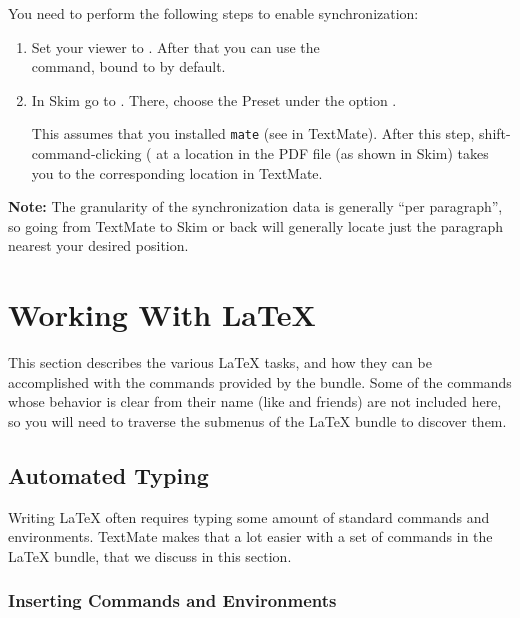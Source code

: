 \documentclass[11pt, x11names]{article}
\begin{document}
You need to perform the following steps to enable synchronization:

\begin{enumerate}

  \item Set your viewer to . After that you can use the\\ command, bound to  by default.

  \item In Skim go to . There, choose the Preset  under the option .

  This assumes that you installed \texttt{mate} (see  in TextMate). After this step, shift-command-clicking (\keys{\shift + \cmd} at a location in the PDF file (as shown in Skim) takes you to the corresponding location in TextMate.

\end{enumerate}

\textbf{Note:} The granularity of the synchronization data is generally “per paragraph”, so going from TextMate to Skim or back will generally locate just the paragraph nearest your desired position.

\section{Working With LaTeX}

This section describes the various LaTeX tasks, and how they can be accomplished with the commands provided by the bundle. Some of the commands whose behavior is clear from their name (like  and friends) are not included here, so you will need to traverse the submenus of the LaTeX bundle to discover them.

\subsection{Automated Typing}

Writing LaTeX often requires typing some amount of standard commands and environments. TextMate makes that a lot easier with a set of commands in the LaTeX bundle, that we discuss in this section.

\subsubsection{Inserting Commands and
Environments}
\end{document}
